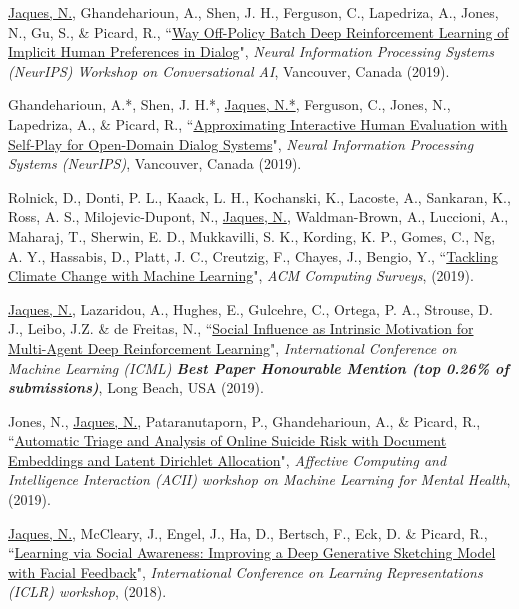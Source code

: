 \documentclass[paper=letter,fontsize=11pt]{scrartcl} %
\newcommand{\PaperEntry}[6]{
		\noindent #1, ``\href{#6}{#2}", \textit{#3}, #4 (#5).}
\begin{document}
\begin{etaremune}
\item \PaperEntry{\underline{Jaques, N.}, Ghandeharioun, A., Shen, J. H., Ferguson, C., Lapedriza, A., Jones, N., Gu, S., \& Picard, R.}{Way Off-Policy Batch Deep Reinforcement Learning of Implicit Human Preferences in Dialog}{Neural Information Processing Systems (NeurIPS) Workshop on Conversational AI}{Vancouver, Canada}{2019}{https://arxiv.org/abs/1907.00456}

\item \PaperEntry{Ghandeharioun, A.*, Shen, J. H.*, \underline{Jaques, N.*}, Ferguson, C., Jones, N., Lapedriza, A., \& Picard, R.}{Approximating Interactive Human Evaluation with Self-Play for Open-Domain Dialog Systems}{Neural Information Processing Systems (NeurIPS)}{Vancouver, Canada}{2019}{https://arxiv.org/abs/1906.09308}

\item \PaperEntry{Rolnick, D., Donti, P. L., Kaack, L. H., Kochanski, K., Lacoste, A., Sankaran, K., Ross, A. S., Milojevic-Dupont, N., \underline{Jaques, N.}, Waldman-Brown, A., Luccioni, A., Maharaj, T., Sherwin, E. D., Mukkavilli, S. K., Kording, K. P., Gomes, C., Ng, A. Y., Hassabis, D., Platt, J. C., Creutzig, F., Chayes, J., Bengio, Y.}{Tackling Climate Change with Machine Learning}{ACM Computing Surveys}{}{2019}{https://arxiv.org/abs/1906.05433}

\item \PaperEntry{\underline{Jaques, N.}, Lazaridou, A., Hughes, E., Gulcehre, C., Ortega, P. A., Strouse, D. J., Leibo, J.Z. \& de Freitas, N.}{Social Influence as Intrinsic Motivation for Multi-Agent Deep Reinforcement Learning}{International Conference on Machine Learning (ICML) \textbf{Best Paper Honourable Mention (top 0.26\% of submissions)}}{Long Beach, USA}{2019}{https://arxiv.org/pdf/1810.08647.pdf}

\item \PaperEntry{Jones, N., \underline{Jaques, N.}, Pataranutaporn, P., Ghandeharioun, A., \& Picard, R.}{Automatic Triage and Analysis of Online Suicide Risk with Document Embeddings and Latent Dirichlet Allocation}{Affective Computing and Intelligence Interaction (ACII) workshop on Machine Learning for Mental Health}{}{2019}{https://drive.google.com/file/d/1muoFj_BXJUZCRyjCLEX9DxKOz7b9nKtj/view?usp=sharing}

\item \PaperEntry{\underline{Jaques, N.}, McCleary, J., Engel, J., Ha, D., Bertsch, F.,  Eck, D. \& Picard, R.}{Learning via Social Awareness: Improving a Deep Generative Sketching Model with Facial Feedback}{International Conference on Learning Representations (ICLR) workshop}{}{2018}{https://arxiv.org/pdf/1802.04877.pdf}


\end{etaremune}
\end{document}
